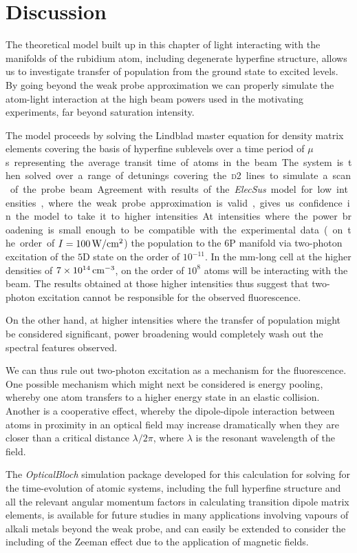 \section{Discussion}
  \label{sec:twophoton_discussion}

  The theoretical model built up in this chapter of light interacting with the
  manifolds of the rubidium atom, including degenerate hyperfine structure,
  allows us to investigate transfer of population from the ground state to
  excited levels. By going beyond the weak probe approximation we can properly
  simulate the atom-light interaction at the high beam powers used in the
  motivating experiments, far beyond saturation intensity.

  The model proceeds by solving the Lindblad master equation for density matrix
  elements covering the basis of hyperfine sublevels over a time period of
  \unit[2]{$\mu $s} representing the average transit time of atoms in the beam.
  The system is then solved over a range of detunings covering the \textsc{d2}
  lines to simulate a scan of the probe beam.

  Agreement with results of the \textit{ElecSus} model for low intensities,
  where the weak probe approximation is valid, gives us confidence in the model
  to take it to higher intensities.At intensities where the power broadening is
  small enough to be compatible with the experimental data (on the order of $I =
  \unit[100]{W/cm^2}$) the population to the $6$P manifold via two-photon
  excitation of the $5$D state on the order of $10^{-11}$. In the
  \unit[2]{mm}-long cell at the higher densities of
  $\unit[7\times10^{14}]{cm^{-3}}$, on the order of $10^{8}$ atoms will be
  interacting with the beam. The results obtained at those higher intensities
  thus suggest that two-photon excitation cannot be responsible for the observed
  fluorescence.

  On the other hand, at higher intensities where the transfer of
  population might be considered significant, power broadening would completely
  wash out the spectral features observed.

  We can thus rule out two-photon excitation as a mechanism for the
  fluorescence. One possible mechanism which might next be considered is energy
  pooling, whereby one atom transfers to a higher energy state in an elastic
  collision\cite{Namiotka1997,Bearman1978}. Another is a cooperative
  effect\cite{Bettles2016,Bettles2015}, whereby the dipole-dipole interaction
  between atoms in proximity in an optical field may increase dramatically when
  they are closer than a critical distance $\lambda/2\pi$, where $\lambda$ is
  the resonant wavelength of the field.

  The \textit{OpticalBloch} simulation package developed for this calculation
  for solving for the time-evolution of atomic systems, including the full
  hyperfine structure and all the relevant angular momentum factors in
  calculating transition dipole matrix elements, is available for future studies
  in many applications involving vapours of alkali metals beyond the weak probe,
  and can easily be extended to consider the including of the Zeeman effect due
  to the application of magnetic fields.
